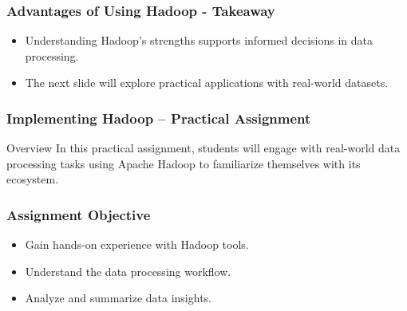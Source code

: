 \documentclass[aspectratio=169]{beamer}
\begin{document}
\begin{frame}[fragile]
    \frametitle{Advantages of Using Hadoop - Takeaway}
    \begin{itemize}
        \item Understanding Hadoop's strengths supports informed decisions in data processing.
        \item The next slide will explore practical applications with real-world datasets.
    \end{itemize}
\end{frame}

\begin{frame}[fragile]
    \frametitle{Implementing Hadoop – Practical Assignment}
    \begin{block}{Overview}
        In this practical assignment, students will engage with real-world data processing tasks using Apache Hadoop to familiarize themselves with its ecosystem.
    \end{block}
\end{frame}

\begin{frame}[fragile]
    \frametitle{Assignment Objective}
    \begin{itemize}
        \item Gain hands-on experience with Hadoop tools.
        \item Understand the data processing workflow.
        \item Analyze and summarize data insights.
    \end{itemize}
\end{frame}
\end{document}
